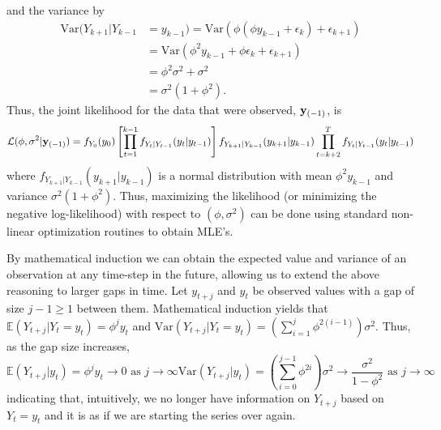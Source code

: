 and the variance by
\begin{equation*}
  \begin{aligned}
    \text{Var}(Y_{k+1}| Y_{k-1} &= y_{k-1}) = \text{Var}(\phi(\phi y_{k-1} + \epsilon_{k}) + \epsilon_{k+1})\\
      &= \text{Var}(\phi^2 y_{k-1} + \phi\epsilon_{k} + \epsilon_{k+1})\\
      &= \phi^2\sigma^2 + \sigma^2\\
      &=\sigma^2(1 + \phi^2).
  \end{aligned}
\end{equation*}
Thus, the joint likelihood for the data that were observed, ${\bf y}_{(-1)}$, is 
\begin{equation*}
    \mathcal{L}(\phi, \sigma^2 | {\bf y}_{(-1)}) = f_{Y_0}(y_0)\left[ \prod_{t=1}^{k-1} f_{Y_t|Y_{t-1}}(y_t|y_{t-1})\right]f_{Y_{k+1}|Y_{k-1}}(y_{k+1}|y_{k-1}) \prod_{t=k+2}^T f_{Y_t|Y_{t-1}}(y_t|y_{t-1})
\end{equation*}
where $f_{Y_{k+1}|Y_{k-1}}(y_{k+1}|y_{k-1})$ is a normal distribution with mean $\phi^2 y_{k-1}$ and variance $\sigma^2(1 + \phi^2)$. Thus, maximizing the likelihood (or minimizing the negative log-likelihood) with respect to $(\phi, \sigma^2)$ can be done using standard non-linear optimization routines to obtain MLE's.

By mathematical induction we can obtain the expected value and variance of an observation at any time-step in the future, allowing us to extend the above reasoning to larger gaps in time. Let $y_{t+j}$ and $y_t$ be observed values with a gap of size $j - 1 \ge 1$ between them. Mathematical induction yields that $\mathbb{E}(Y_{t+j} | Y_t = y_t) = \phi^j y_t$ and $\text{Var}(Y_{t+j}|Y_t = y_t) = (\sum_{i=1}^j \phi^{2(i-1)})\sigma^2$. Thus, as the gap size increases,
\begin{subequations}
    \begin{equation*}
        \mathbb{E}(Y_{t+j}|y_t) = \phi^j y_t \to 0 \text{ as } j \to \infty
    \end{equation*}
    \begin{equation*}
        \text{Var}(Y_{t+j}|y_t) = (\sum_{i=0}^{j-1} \phi^{2i})\sigma^2 \to \frac{\sigma^2}{1 - \phi^2} \text{ as } j \to \infty
    \end{equation*}
\end{subequations}
indicating that, intuitively, we no longer have information on $Y_{t+j}$ based on $Y_t = y_t$ and it is as if we are starting the series over again.


